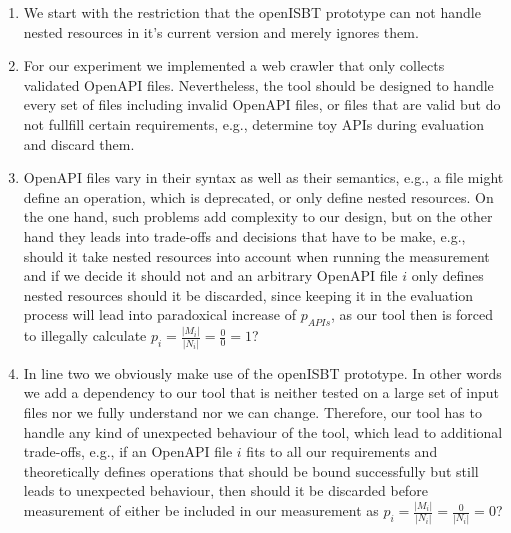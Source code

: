 \begin{enumerate}

    \item We start with the restriction that the openISBT prototype can not handle nested resources in it's current version and merely ignores them.
    \item For our experiment we implemented a web crawler that only collects validated OpenAPI files. Nevertheless, the tool should be designed to handle every set of files including invalid OpenAPI files, or files that are valid but do not fullfill certain requirements, e.g., determine toy APIs during evaluation and discard them.
    \item OpenAPI files vary in their syntax as well as their semantics, e.g., a file might define an operation, which is deprecated, or only define nested resources. On the one hand, such problems add complexity to our design, but on the other hand they leads into trade-offs and decisions that have to be make, e.g., should it take nested resources into account when running the measurement and if we decide it should not and an arbitrary OpenAPI file \(i\) only defines nested resources should it be discarded, since keeping it in the evaluation process will lead into paradoxical increase of \(p_{APIs}\), as our tool then is forced to illegally calculate \(p_i = \frac{|M_i|}{|N_i|} = \frac{0}{0} = 1\)?
    \item In line two we obviously make use of the openISBT prototype. In other words we add a dependency to our tool that is neither tested on a large set of input files nor we fully understand nor we can change.
    Therefore, our tool has to handle any kind of unexpected behaviour of the tool, which lead to additional trade-offs, e.g., if an OpenAPI file \(i\) fits to all our requirements and theoretically defines operations that should be bound successfully but still leads to unexpected behaviour, then should it be discarded before measurement of either be included in our measurement as \(p_i = \frac{|M_i|}{|N_i|} = \frac{0}{|N_i|} = 0\)?
\end{enumerate}


